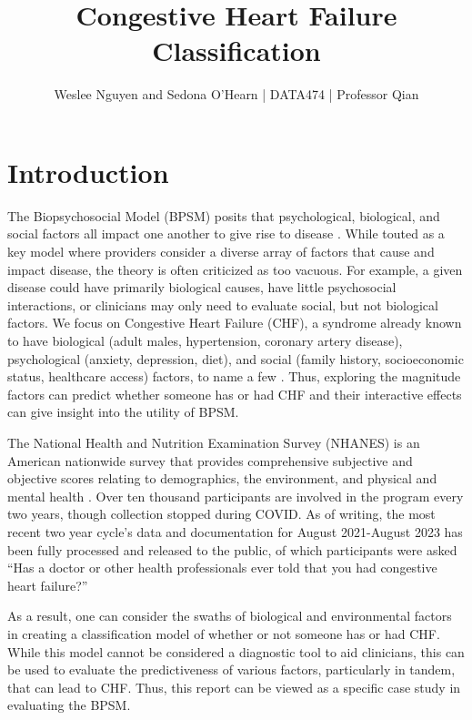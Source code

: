 \documentclass{article}
\title{Congestive Heart Failure Classification \vspace{-2ex}}
\author{Weslee Nguyen and Sedona O'Hearn | DATA474 | Professor Qian}
\date{}
\begin{document}
\maketitle
\vspace{-20mm}
\section*{Introduction}
\vspace{-6mm}
The Biopsychosocial Model (BPSM) posits that psychological, biological, and social factors all impact one another to give rise to disease \citep{BPSM2023}. While touted as a key model where providers consider a diverse array of factors that cause and impact disease, the theory is often criticized as too vacuous. For example, a given disease could have primarily biological causes, have little psychosocial interactions, or clinicians may only need to evaluate social, but not biological factors. We focus on Congestive Heart Failure (CHF), a syndrome already known to have biological (adult males, hypertension, coronary artery disease), psychological (anxiety, depression, diet), and social (family history, socioeconomic status, healthcare access) factors, to name a few \citep{CHFPathophysiology2021, CHF-BPSM2025}. Thus, exploring the magnitude factors can predict whether someone has or had CHF and their interactive effects can give insight into the utility of BPSM.

The National Health and Nutrition Examination Survey (NHANES) is an American nationwide survey that provides comprehensive subjective and objective scores relating to demographics, the environment, and physical and mental health \citep{CHF-NHANESA2024}. Over ten thousand participants are involved in the program every two years, though collection stopped during COVID. As of writing, the most recent two year cycle's data and documentation for August 2021-August 2023 has been fully processed and released to the public, of which participants were asked ``Has a doctor or other health professionals ever told that you had congestive heart failure?''

As a result, one can consider the swaths of biological and environmental factors in creating a classification model of whether or not someone has or had CHF. While this model cannot be considered a diagnostic tool to aid clinicians, this can be used to evaluate the predictiveness of various factors, particularly in tandem, that can lead to CHF. Thus, this report can be viewed as a specific case study in evaluating the BPSM.
\end{document}
